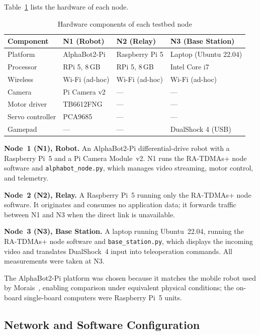 Table~\ref{tab:hardware} lists the hardware of each node.

\begin{table}[h]
\centering
\caption{Hardware components of each testbed node}
\label{tab:hardware}
\begin{tabular}{llll}
\toprule
\textbf{Component} & \textbf{N1 (Robot)} & \textbf{N2 (Relay)} & \textbf{N3 (Base Station)} \\
\midrule
Platform         & AlphaBot2-Pi    & Raspberry Pi 5  & Laptop (Ubuntu 22.04) \\
Processor        & RPi 5, 8\,GB    & RPi 5, 8\,GB    & Intel Core i7 \\
Wireless         & Wi-Fi (ad-hoc)  & Wi-Fi (ad-hoc)  & Wi-Fi (ad-hoc) \\
Camera           & Pi Camera v2    & ---             & --- \\
Motor driver     & TB6612FNG       & ---             & --- \\
Servo controller & PCA9685         & ---             & --- \\
Gamepad          & ---             & ---             & DualShock 4 (USB) \\
\bottomrule
\end{tabular}
\end{table}

\textbf{Node~1 (N1), Robot.} An AlphaBot2-Pi differential-drive robot with
a Raspberry Pi~5 and a Pi Camera Module~v2. N1 runs the RA-TDMAs+ node
software and \texttt{alphabot\_node.py}, which manages video streaming, motor
control, and telemetry.

\textbf{Node~2 (N2), Relay.} A Raspberry Pi~5 running only the RA-TDMAs+
node software. It originates and consumes no application data; it forwards
traffic between N1 and N3 when the direct link is unavailable.

\textbf{Node~3 (N3), Base Station.} A laptop running Ubuntu~22.04, running
the RA-TDMAs+ node software and \texttt{base\_station.py}, which displays the
incoming video and translates DualShock~4 input into teleoperation commands.
All measurements were taken at N3.

The AlphaBot2-Pi platform was chosen because it matches the mobile robot used
by Morais~\cite{morais2024synchronization}, enabling comparison under
equivalent physical conditions; the on-board single-board computers were
Raspberry Pi~5 units.

\subsection{Network and Software Configuration}
\label{subsec:netconfig}

